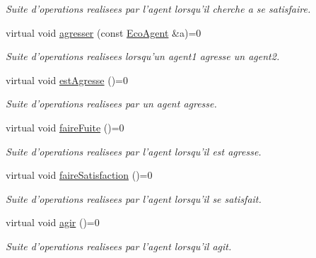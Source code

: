 \begin{CompactItemize}
\begin{CompactList}\small\item\em Suite d'operations realisees par l'agent lorsqu'il cherche a se satisfaire. \item\end{CompactList}\item 
virtual void \hyperlink{classEcoAgent_5d7e837b4a3a6b73fc1fb60c5fddefa5}{agresser} (const \hyperlink{classEcoAgent}{EcoAgent} \&a)=0
\begin{CompactList}\small\item\em Suite d'operations realisees lorsqu'un agent1 agresse un agent2. \item\end{CompactList}\item 
\hypertarget{classEcoAgent_a27bced909d9d84e8f23ec2d65bbed56}{
virtual void \hyperlink{classEcoAgent_a27bced909d9d84e8f23ec2d65bbed56}{estAgresse} ()=0}
\label{classEcoAgent_a27bced909d9d84e8f23ec2d65bbed56}

\begin{CompactList}\small\item\em Suite d'operations realisees par un agent agresse. \item\end{CompactList}\item 
\hypertarget{classEcoAgent_80b798ec4abc1585c42185ae88445695}{
virtual void \hyperlink{classEcoAgent_80b798ec4abc1585c42185ae88445695}{faireFuite} ()=0}
\label{classEcoAgent_80b798ec4abc1585c42185ae88445695}

\begin{CompactList}\small\item\em Suite d'operations realisees par l'agent lorsqu'il est agresse. \item\end{CompactList}\item 
\hypertarget{classEcoAgent_ab76d1cc6f418192d90fc42c2fc4d8ac}{
virtual void \hyperlink{classEcoAgent_ab76d1cc6f418192d90fc42c2fc4d8ac}{faireSatisfaction} ()=0}
\label{classEcoAgent_ab76d1cc6f418192d90fc42c2fc4d8ac}

\begin{CompactList}\small\item\em Suite d'operations realisees par l'agent lorsqu'il se satisfait. \item\end{CompactList}\item 
\hypertarget{classEcoAgent_ec8ff50dddde6ad423ee13ee602adcaf}{
virtual void \hyperlink{classEcoAgent_ec8ff50dddde6ad423ee13ee602adcaf}{agir} ()=0}
\label{classEcoAgent_ec8ff50dddde6ad423ee13ee602adcaf}

\begin{CompactList}\small\item\em Suite d'operations realisees par l'agent lorsqu'il agit. \item\end{CompactList}\end{CompactItemize}


